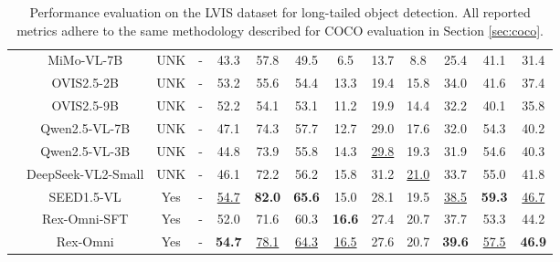 \begin{table}[t]
{\begin{tabular}{cc|cc|ccccccccc}
& MiMo-VL-7B               & UNK & - & 43.3 & 57.8 & \multicolumn{1}{c|}{49.5} & 6.5  & 13.7 & \multicolumn{1}{c|}{8.8}  & 25.4 & 41.1 & 31.4 \\
& OVIS2.5-2B               & UNK & - & 53.2 & 55.6 & \multicolumn{1}{c|}{54.4} & 13.3 & 19.4 & \multicolumn{1}{c|}{15.8} & 34.0 & 41.6 & 37.4 \\
& OVIS2.5-9B               & UNK & - & 52.2 & 54.1 & \multicolumn{1}{c|}{53.1} & 11.2 & 19.9 & \multicolumn{1}{c|}{14.4} & 32.2 & 40.1 & 35.8 \\
& Qwen2.5-VL-7B            & UNK & - & 47.1 & 74.3 & \multicolumn{1}{c|}{57.7} & 12.7 & 29.0 & \multicolumn{1}{c|}{17.6} & 32.0 & 54.3 & 40.2 \\
& Qwen2.5-VL-3B            & UNK & - & 44.8 & 73.9 & \multicolumn{1}{c|}{55.8} & 14.3 & \underline{29.8} & \multicolumn{1}{c|}{19.3} & 31.9 & 54.6 & 40.3 \\
& DeepSeek-VL2-Small       & UNK & - & 46.1 & 72.2 & \multicolumn{1}{c|}{56.2} & 15.8 & 31.2 & \multicolumn{1}{c|}{\underline{21.0}} & 33.7 & 55.0 & 41.8 \\
& SEED1.5-VL               & Yes & - & \underline{54.7} & \textbf{82.0} & \multicolumn{1}{c|}{\textbf{65.6}} & 15.0 & 28.1 & \multicolumn{1}{c|}{19.5} & \underline{38.5} & \textbf{59.3} & \underline{46.7} \\
\rowcolor{lightblue!10}
& Rex-Omni-SFT             & Yes & - & 52.0 & 71.6 & \multicolumn{1}{c|}{60.3} & \textbf{16.6} & 27.4 & \multicolumn{1}{c|}{20.7} & 37.7 & 53.3 & 44.2 \\
\rowcolor{lightblue!10}
& Rex-Omni                 & Yes & - & \textbf{54.7} & \underline{78.1} & \multicolumn{1}{c|}{\underline{64.3}} & \underline{16.5} & 27.6 & \multicolumn{1}{c|}{20.7} & \textbf{39.6} & \underline{57.5} & \textbf{46.9} \\
\bottomrule
\end{tabular}
    }
    \caption{Performance evaluation on the LVIS dataset for long-tailed object detection. All reported metrics adhere to the same methodology described for COCO evaluation in Section \ref{sec:coco}.}
    \label{tab:long_tailed_object_detection}
\end{table}
